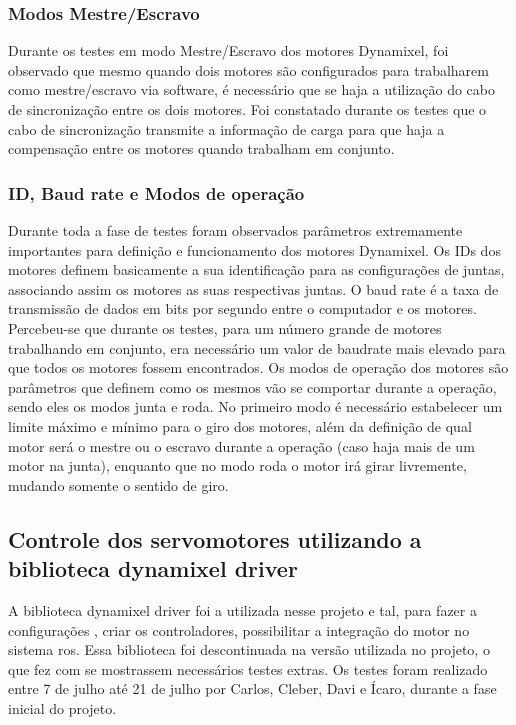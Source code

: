 \subsubsection{Modos Mestre/Escravo}
Durante os testes em modo Mestre/Escravo dos motores Dynamixel, foi observado que mesmo quando dois motores são configurados para trabalharem como mestre/escravo via software, é necessário que se haja a utilização do cabo de sincronização entre os dois motores. Foi constatado durante os testes que o cabo de sincronização transmite a informação de carga para que haja a compensação entre os motores quando trabalham em conjunto. 

\subsubsection{ID, Baud rate e Modos de operação}
Durante toda a fase de testes foram observados parâmetros extremamente importantes para definição e funcionamento dos motores Dynamixel. Os IDs dos motores definem basicamente a sua identificação para as configurações de juntas, associando assim os motores as suas respectivas juntas. 
O baud rate é a taxa de transmissão de dados em bits por segundo entre o computador e os motores. Percebeu-se que durante os testes, para um número grande de motores trabalhando em conjunto, era necessário um valor de baudrate mais elevado para que todos os motores fossem encontrados. 
Os modos de operação dos motores são parâmetros que definem como os mesmos vão se comportar durante a operação, sendo eles os modos junta e roda. No primeiro modo é necessário estabelecer um limite máximo e mínimo para o giro dos motores, além da definição de qual  motor será o mestre ou o escravo durante a operação (caso haja mais de um motor na junta), enquanto que no modo roda o motor irá girar livremente, mudando somente o sentido de giro. 

\subsection{Controle dos servomotores utilizando a biblioteca dynamixel driver}
A biblioteca dynamixel driver foi a utilizada nesse projeto e tal, para fazer a configurações , criar os controladores, possibilitar a integração do motor no sistema ros. Essa biblioteca foi descontinuada na versão utilizada no projeto, o que fez com se mostrassem necessários testes extras. Os testes foram realizado  entre 7 de julho até 21 de julho por Carlos, Cleber, Davi e Ícaro, durante a fase inicial do projeto.

